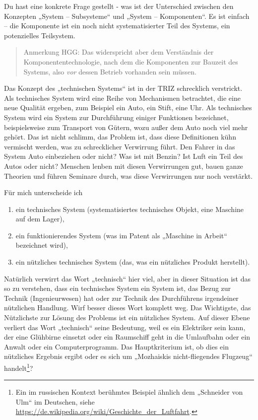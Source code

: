 \documentclass[11pt,a4paper]{article}
\begin{document}
Du hast eine konkrete Frage gestellt - was ist der Unterschied zwischen den
Konzepten „System -- Subsysteme“ und „System -- Komponenten“. Es ist einfach
-- die Komponente ist ein noch nicht systematisierter Teil des Systems, ein
potenzielles Teilsystem.
\begin{quote}
  Anmerkung HGG: Das widerspricht aber dem Verständnis der
  Komponententechnologie, nach dem die Komponenten zur Bauzeit des Systems,
  also \emph{vor} dessen Betrieb vorhanden sein müssen.
\end{quote}

Das Konzept des „technischen Systems“ ist in der TRIZ schrecklich verstrickt.
Als technisches System wird eine Reihe von Mechanismen betrachtet, die eine
neue Qualität ergeben, zum Beispiel ein Auto, ein Stift, eine Uhr. Als
technisches System wird ein System zur Durchführung einiger Funktionen
bezeichnet, beispielsweise zum Transport von Gütern, wozu außer dem Auto noch
viel mehr gehört. Das ist nicht schlimm, das Problem ist, dass diese
Definitionen kühn vermischt werden, was zu schrecklicher Verwirrung führt.
Den Fahrer in das System Auto einbeziehen oder nicht? Was ist mit Benzin? Ist
Luft ein Teil des Autos oder nicht? Menschen lenben mit diesen Verwirrungen
gut, bauen ganze Theorien und führen Seminare durch, was diese Verwirrungen
nur noch verstärkt.

Für mich unterscheide ich
\begin{enumerate}
\item ein technisches System (systematisiertes technisches Objekt, eine
  Maschine auf dem Lager),
\item ein funktionierendes System (was im Patent als „Maschine in Arbeit“
  bezeichnet wird),
\item ein nützliches technisches System (das, was ein nützliches Produkt
  herstellt).
\end{enumerate}

Natürlich verwirrt das Wort „technisch“ hier viel, aber in dieser Situation
ist das so zu verstehen, dass ein technisches System ein System ist, das Bezug
zur Technik (Ingenieurwesen) hat oder zur Technik des Durchführens irgendeiner
nützlichen Handlung. Wirf besser dieses Wort komplett weg. Das Wichtigste, das
Nützlichste zur Lösung des Problems ist ein nützliches System. Auf dieser
Ebene verliert das Wort „technisch“ seine Bedeutung, weil es ein Elektriker
sein kann, der eine Glühbirne einsetzt oder ein Raumschiff geht in die
Umlaufbahn oder ein Anwalt oder ein Computerprogramm. Das Hauptkriterium ist,
ob dies ein nützliches Ergebnis ergibt oder es sich um „Mozhaiskis
nicht-fliegendes Flugzeug“ handelt\footnote{Ein im russischen Kontext
  berühmtes Beispiel ähnlich dem „Schneider von Ulm“ im Deutschen, siehe
  \url{https://de.wikipedia.org/wiki/Geschichte_der_Luftfahrt}.}?
\end{document}
